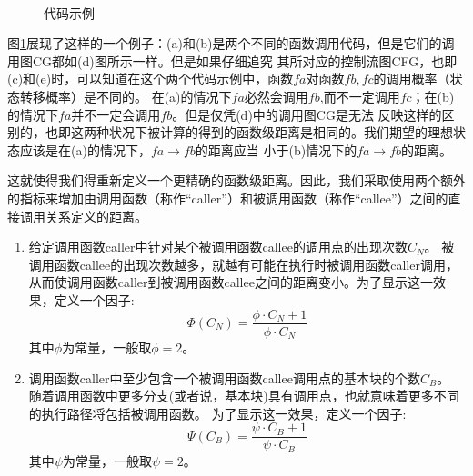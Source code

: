 \documentclass[bachelor]{njupthesis}
\begin{document}
\begin{figure}[htb]
	\centering
	 \\
	\caption{代码示例}
 	\label{pic:code}
\end{figure}

图\ref{pic:code}展现了这样的一个例子：(a)和(b)是两个不同的函数调用代码，但是它们的调用图CG都如(d)图所示一样。但是如果仔细追究
其所对应的控制流图CFG，也即(c)和(e)时，可以知道在这个两个代码示例中，函数$fa$对函数$fb,fc$的调用概率（状态转移概率）是不同的。
在(a)的情况下$fa$必然会调用$fb$,而不一定调用$fc$；在(b)的情况下$fa$并不一定会调用$fb$。但是仅凭(d)中的调用图CG是无法
反映这样的区别的，也即这两种状况下被计算的得到的函数级距离是相同的。我们期望的理想状态应该是在(a)的情况下，$fa \to fb$的距离应当
小于(b)情况下的$fa \to fb$的距离。

这就使得我们得重新定义一个更精确的函数级距离。因此，我们采取使用两个额外的指标来增加由调用函数（称作“caller”）和被调用函数（称作“callee”）之间的直接调用关系定义的距离。
\begin{enumerate}[label=(\arabic*)]
	\item 给定调用函数caller中针对某个被调用函数callee的调用点的出现次数$C_N$。
	被调用函数callee的出现次数越多，就越有可能在执行时被调用函数caller调用，
	从而使调用函数caller到被调用函数callee之间的距离变小。为了显示这一效果，定义一个因子:
	\begin{equation}
	\Phi (C_N)=\frac{\phi \cdot C_N+1}{\phi \cdot C_N}
	\end{equation}
	其中$\phi$为常量，一般取$\phi=2$。
	\item 调用函数caller中至少包含一个被调用函数callee调用点的基本块的个数$C_B$。
	随着调用函数中更多分支(或者说，基本块)具有调用点，也就意味着更多不同的执行路径将包括被调用函数。
	为了显示这一效果，定义一个因子:
	\begin{equation}
	\Psi (C_B)=\frac{\psi \cdot C_B+1}{\psi \cdot C_B}
	\end{equation}
	其中$\psi$为常量，一般取$\psi=2$。	
\end{enumerate}
\end{document}
